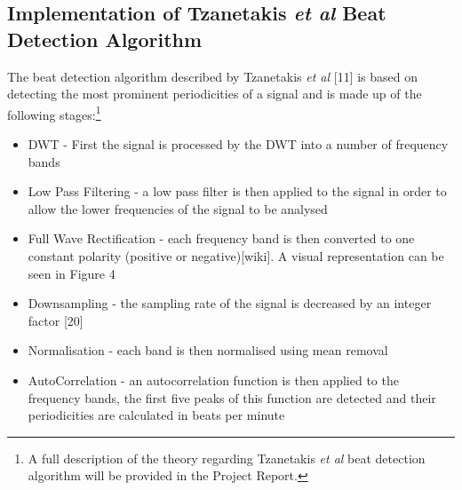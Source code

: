 \documentclass[a4paper, 11pt]{article}
\begin{document}

\subsection{Implementation of Tzanetakis \textit{et al} Beat Detection Algorithm}
The beat detection algorithm described by Tzanetakis \textit{et al} [11] is based on detecting the most prominent periodicities of a signal and is made up of the following stages:\footnote{A full description of the theory regarding Tzanetakis \textit{et al} beat detection algorithm will be provided in the Project Report.}

\begin{itemize}
\item DWT - First the signal is processed by the DWT into a number of frequency bands 
\item Low Pass Filtering - a low pass filter is then applied to the signal in order to allow the lower frequencies of the signal to be analysed
\item Full Wave Rectification - each frequency band is then converted to one constant polarity (positive or negative)[wiki]. A visual representation can be seen in Figure 4
\item Downsampling - the sampling rate of the signal is decreased by an integer factor [20]
\item Normalisation - each band is then normalised using mean removal
\item AutoCorrelation - an autocorrelation function is then applied to the frequency bands, the first five peaks of this function are detected and their periodicities are calculated in beats per minute
\end{itemize}
\end{document}
